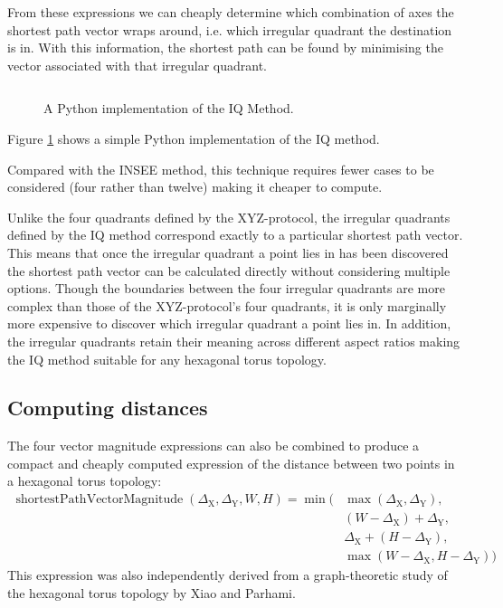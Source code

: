 			From these expressions we can cheaply determine which combination of axes
			the shortest path vector wraps around, i.e. which irregular quadrant the
			destination is in. With this information, the shortest path can be found
			by minimising the vector associated with that irregular quadrant.
			
			\begin{figure}
				\inputminted{python}{figures/iqmethod.py}
				
				\caption{A Python implementation of the IQ Method.}
				\label{fig:iqmethod.py}
			\end{figure}
			
			Figure \ref{fig:iqmethod.py} shows a simple Python implementation of the IQ
			method.
			
			Compared with the INSEE method, this technique requires fewer cases to be
			considered (four rather than twelve) making it cheaper to compute.
			
			Unlike the four quadrants defined by the XYZ-protocol, the irregular
			quadrants defined by the IQ method correspond exactly to a particular
			shortest path vector. This means that once the irregular quadrant a point
			lies in has been discovered the shortest path vector can be calculated
			directly without considering multiple options. Though the boundaries
			between the four irregular quadrants are more complex than those of the
			XYZ-protocol's four quadrants, it is only marginally more expensive to
			discover which irregular quadrant a point lies in. In addition, the
			irregular quadrants retain their meaning across different aspect ratios
			making the IQ method suitable for any hexagonal torus topology.
		
		\subsection{Computing distances}
		
			The four vector magnitude expressions can also be combined to produce a
			compact and cheaply computed expression of the distance between two
			points in a hexagonal torus topology:
			\begin{align*}
				\operatorname{shortestPathVectorMagnitude}(\Delta_\textrm{X}, \Delta_\textrm{Y}, W, H) =
				\operatorname{min}(&\operatorname{max}(\Delta_\textrm{X}, \Delta_\textrm{Y}),\\
				                   &(W - \Delta_\textrm{X}) + \Delta_\textrm{Y},\\
				                   &\Delta_\textrm{X} + (H - \Delta_\textrm{Y}),\\
				                   &\operatorname{max}(W-\Delta_\textrm{X}, H-\Delta_\textrm{Y}))
			\end{align*}
			This expression was also independently derived from a graph-theoretic
			study of the hexagonal torus topology by Xiao and Parhami\cite{xiao04}.
		
